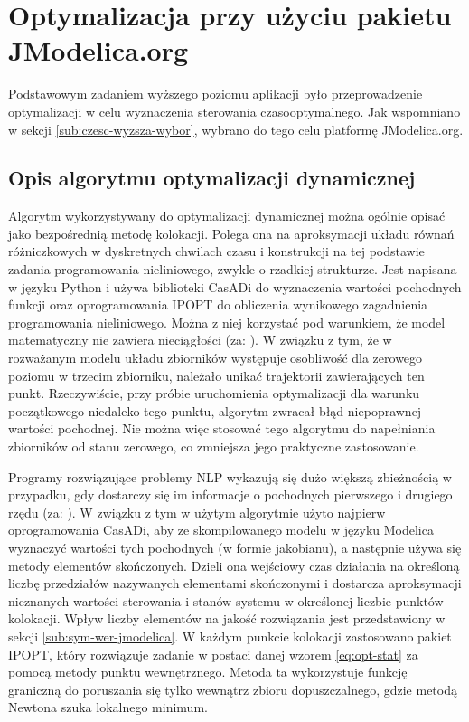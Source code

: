 \section{Optymalizacja przy użyciu pakietu JModelica.org}
\label{sec:opt}

Podstawowym zadaniem wyższego poziomu aplikacji było przeprowadzenie optymalizacji w celu wyznaczenia sterowania czasooptymalnego. Jak wspomniano w sekcji \ref{sub:czesc-wyzsza-wybor}, wybrano do tego celu platformę JModelica.org.

\subsection{Opis algorytmu optymalizacji dynamicznej}
\label{sub:opt-alg}

Algorytm wykorzystywany do optymalizacji dynamicznej można ogólnie opisać jako bezpośrednią metodę kolokacji. Polega ona na aproksymacji układu równań różniczkowych w dyskretnych chwilach czasu i konstrukcji na tej podstawie zadania programowania nieliniowego, zwykle o rzadkiej strukturze. Jest napisana w języku Python i używa biblioteki CasADi do wyznaczenia wartości pochodnych funkcji oraz oprogramowania IPOPT do obliczenia wynikowego zagadnienia programowania nieliniowego. Można z niej korzystać pod warunkiem, że model matematyczny nie zawiera nieciągłości (za: \cite{JModelicaUserGuide}). W związku z tym, że w rozważanym modelu układu zbiorników występuje osobliwość dla zerowego poziomu w trzecim zbiorniku, należało unikać trajektorii zawierających ten punkt.
Rzeczywiście, przy próbie uruchomienia optymalizacji dla warunku początkowego niedaleko tego punktu, algorytm zwracał błąd niepoprawnej wartości pochodnej.
Nie można więc stosować tego algorytmu do napełniania zbiorników od stanu zerowego, co zmniejsza jego praktyczne zastosowanie.

Programy rozwiązujące problemy NLP wykazują się dużo większą zbieżnością w przypadku, gdy dostarczy się im informacje o pochodnych pierwszego i drugiego rzędu (za: \cite{and+11mod11}). W związku z tym w użytym algorytmie użyto najpierw oprogramowania CasADi, aby ze skompilowanego modelu w języku Modelica wyznaczyć wartości tych pochodnych (w formie jakobianu), a następnie używa się metody elementów skończonych. Dzieli ona wejściowy czas działania na określoną liczbę przedziałów nazywanych elementami skończonymi i dostarcza aproksymacji nieznanych wartości sterowania i stanów systemu w określonej liczbie punktów kolokacji. Wpływ liczby elementów na jakość rozwiązania jest przedstawiony w sekcji \ref{sub:sym-wer-jmodelica}.
W każdym punkcie kolokacji zastosowano pakiet IPOPT, który rozwiązuje zadanie w postaci danej wzorem \ref{eq:opt-stat} za pomocą metody punktu wewnętrznego. Metoda ta wykorzystuje funkcję graniczną do poruszania się tylko wewnątrz zbioru dopuszczalnego, gdzie metodą Newtona szuka lokalnego minimum.

